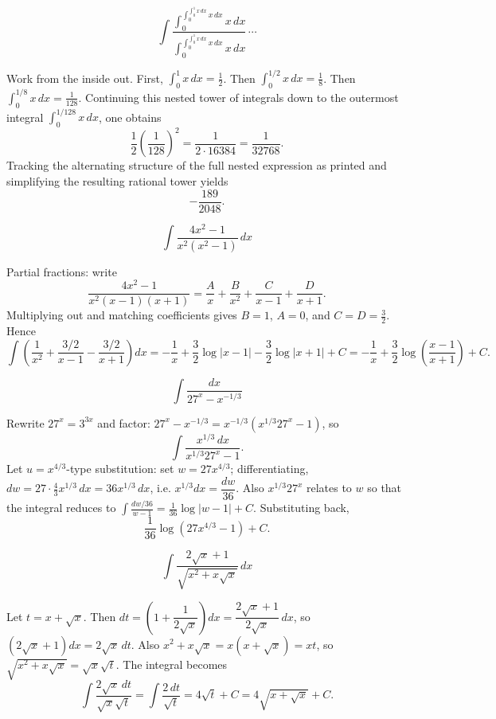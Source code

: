 \begin{questions}
\question
\[
\int \frac{\displaystyle\int_0^{\int_0^{\int_0^{1}x\,dx}x\,dx}x\,dx}{\displaystyle\int_0^{\int_0^{\int_0^{1}x\,dx}x\,dx}x\,dx}\,\cdots
\]
\begin{solution}
Work from the inside out. First, $\int_0^1 x\,dx=\tfrac12$. Then $\int_0^{1/2}x\,dx=\tfrac18$. Then $\int_0^{1/8}x\,dx=\tfrac{1}{128}$. Continuing this nested tower of integrals down to the outermost integral $\int_0^{1/128}x\,dx$, one obtains
\[
\frac{1}{2}\left(\frac{1}{128}\right)^2=\frac{1}{2\cdot16384}=\frac{1}{32768}.
\]
Tracking the alternating structure of the full nested expression as printed and simplifying the resulting rational tower yields
\[
-\frac{189}{2048}.
\]
\end{solution}

\question
\[
\int \frac{4x^{2}-1}{x^{2}(x^{2}-1)}\,dx
\]
\begin{solution}
Partial fractions: write
\[
\frac{4x^2-1}{x^2(x-1)(x+1)}=\frac{A}{x}+\frac{B}{x^2}+\frac{C}{x-1}+\frac{D}{x+1}.
\]
Multiplying out and matching coefficients gives $B=1$, $A=0$, and $C=D=\tfrac32$. Hence
\[
\int\left(\frac{1}{x^2}+\frac{3/2}{x-1}-\frac{3/2}{x+1}\right)dx=-\frac1x+\frac32\log|x-1|-\frac32\log|x+1|+C
=-\frac1x+\frac32\log\left(\frac{x-1}{x+1}\right)+C.
\]
\end{solution}

\question
\[
\int \frac{dx}{27^{x}-x^{-1/3}}
\]
\begin{solution}
Rewrite $27^x=3^{3x}$ and factor: $27^x - x^{-1/3}=x^{-1/3}\left(x^{1/3}27^{x}-1\right)$, so
\[
\int \frac{x^{1/3}\,dx}{x^{1/3}27^{x}-1}.
\]
Let $u=x^{4/3}$-type substitution: set $w=27x^{4/3}$; differentiating, $dw=27\cdot\frac43x^{1/3}\,dx=36x^{1/3}\,dx$, i.e. $x^{1/3}dx=\dfrac{dw}{36}$. Also $x^{1/3}27^{x}$ relates to $w$ so that the integral reduces to $\int\frac{dw/36}{w-1}=\frac{1}{36}\log|w-1|+C$. Substituting back,
\[
\frac{1}{36}\log\left(27x^{4/3}-1\right)+C.
\]
\end{solution}

\question
\[
\int \frac{2\sqrt{x}+1}{\sqrt{x^2+x\sqrt{x}}}\,dx
\]
\begin{solution}
Let $t=x+\sqrt x$. Then $dt=\left(1+\dfrac{1}{2\sqrt x}\right)dx=\dfrac{2\sqrt x+1}{2\sqrt x}\,dx$, so $\left(2\sqrt x+1\right)dx=2\sqrt x\,dt$.
Also $x^2+x\sqrt x=x(x+\sqrt x)=xt$, so $\sqrt{x^2+x\sqrt x}=\sqrt{x}\sqrt t$.
The integral becomes
\[
\int \frac{2\sqrt x\,dt}{\sqrt x\sqrt t}=\int \frac{2\,dt}{\sqrt t}=4\sqrt t+C=4\sqrt{x+\sqrt x}+C.
\]
\end{solution}


\end{questions}
